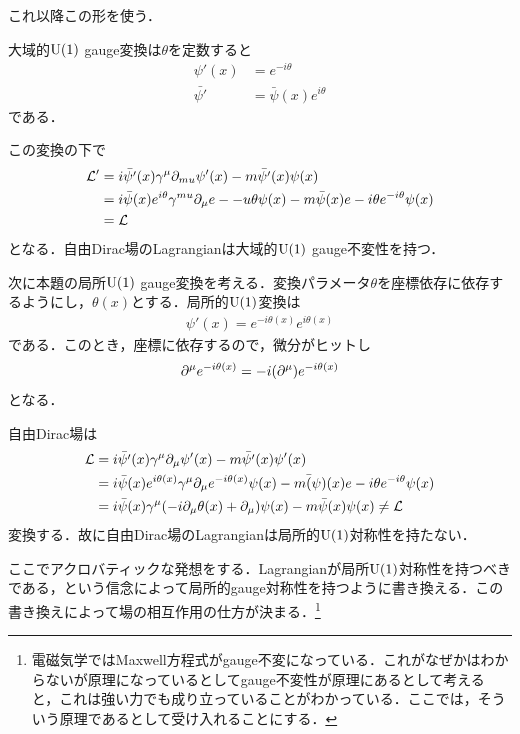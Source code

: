 	これ以降この形を使う．


	大域的$\mathrm{U}(1)$ gauge変換は$\theta$を定数すると
	\begin{align}
			\psi'(x) &= e^{-i\theta}\\
			\bar{\psi'} &= \bar{\psi}(x)e^{i\theta}
	\end{align}
	である．

	この変換の下で
	\begin{align}
			\mathcal{L}'
			&= i\bar{\psi'}(x)\gamma^{\mu}\partial_{mu}\psi'(x) - m \bar{\psi'}(x)\psi(x)\\
			&= i\bar{\psi}(x)e^{i\theta}\gamma^{mu}\partial_{\mu}e-{-u\theta}\psi(x) - m\bar{\psi}(x)e-{i\theta}e^{-i\theta}\psi(x)\\
			&= \mathcal{L}
	\end{align}
	となる．自由Dirac場のLagrangianは大域的$\mathrm{U}(1)$ gauge不変性を持つ．

	次に本題の局所$\mathrm{U}(1)$ gauge変換を考える．変換パラメータ$\theta$を座標依存に依存するようにし，$\theta(x)$とする．局所的$\mathrm{U}(1)$変換は
	\begin{align}
			\psi'(x) = e^{-i\theta(x)}e^{i\theta(x)}
	\end{align}
	である．このとき，座標に依存するので，微分がヒットし
	\begin{align}
			\partial^{\mu}e^{-i\theta(x)} = -i\qty(\partial^{\mu})e^{-i\theta(x)}
	\end{align}
	となる．

	自由Dirac場は
	\begin{align}
			\mathcal{L}
			&= i\bar{\psi'}(x)\gamma^{\mu}\partial_{\mu}\psi'(x) - m\bar{\psi'}(x)\psi'(x)\\
			&= i\bar{\psi}(x)e^{i\theta(x)}\gamma^{\mu}\partial_{\mu}e^{-i\theta(x)}\psi(x) - m\bar(\psi)(x)e-{i\theta}e^{-i\theta}\psi(x)\\
			&= i\bar{\psi}(x)\gamma^{\mu}\qty(-i\partial_{\mu}\theta(x) + \partial_{\mu})\psi(x) - m \bar{\psi}(x)\psi(x) \neq \mathcal{L}
	\end{align}
	変換する．故に自由Dirac場のLagrangianは局所的$\mathrm{U}(1)$対称性を持たない．

	ここでアクロバティックな発想をする．Lagrangianが局所$\mathrm{U}(1)$対称性を持つべきである，という信念によって局所的gauge対称性を持つように書き換える．この書き換えによって場の相互作用の仕方が決まる．\footnote{電磁気学ではMaxwell方程式がgauge不変になっている．これがなぜかはわからないが原理になっているとしてgauge不変性が原理にあるとして考えると，これは強い力でも成り立っていることがわかっている．ここでは，そういう原理であるとして受け入れることにする．}

